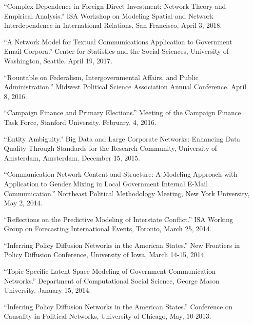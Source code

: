 \documentclass[overlapped,line]{res}
\begin{document}
\begin{resume}
\begin{etaremune}
\item ``Complex Dependence in Foreign Direct Investment: Network Theory and Empirical Analysis.'' ISA Workshop on Modeling Spatial and Network Interdependence in International Relations, San Francisco, April 3, 2018.
\item ``A Network Model for Textual Communications Application to Government Email Corpora.'' Center for Statistics and the Social Sciences, University of Washington, Seattle. April 19, 2017.
\item ``Rountable on Federalism, Intergovernmental Affairs, and Public Administration.'' Midwest Political Science Association Annual Conference. April 8, 2016. 
\item ``Campaign Finance and Primary Elections.'' Meeting of the Campaign Finance Task Force, Stanford University. February, 4, 2016.
\item ``Entity Ambiguity.'' Big Data and Large Corporate Networks: Enhancing Data Quality Through Standards for the Research Community, University of Amsterdam, Amsterdam. December 15, 2015. 
\item ``Communication Network Content and Structure: A Modeling Approach with Application to Gender Mixing in Local Government Internal E-Mail Communication.'' Northeast Political Methodology Meeting, New York University, May 2, 2014.
\item ``Reflections on the Predictive Modeling of Interstate Conflict.'' ISA Working Group on Forecasting International Events, Toronto, March 25, 2014.
\item ``Inferring Policy Diffusion Networks in the American States.'' New Frontiers in Policy Diffusion Conference, University of  Iowa,  March 14-15, 2014.
\item  ``Topic-Specific Latent Space Modeling of Government Communication Networks.'' Department of Computational Social Science, George Mason University, January 15, 2014.
\item ``Inferring Policy Diffusion Networks in the American States.'' Conference on Causality in Political Networks, University of Chicago, May, 10 2013.
\end{etaremune}


\end{resume}
\end{document}
